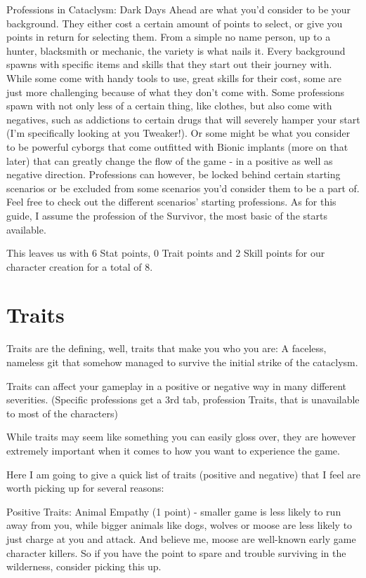 \documentclass[11pt]{report}
\begin{document}
Professions in Cataclysm: Dark Days Ahead are what you'd consider to be your background. They either cost a certain amount of points to select, or give you points in return for selecting them. From a simple no name person, up to a hunter, blacksmith or mechanic, the variety is what nails it. Every background spawns with specific items and skills that they start out their journey with. While some come with handy tools to use, great skills for their cost, some are just more challenging because of what they don't come with. Some professions spawn with not only less of a certain thing, like clothes, but also come with negatives, such as addictions to certain drugs that will severely hamper your start (I'm specifically looking at you Tweaker!). Or some might be what you consider to be powerful cyborgs that come outfitted with Bionic implants (more on that later) that can greatly change the flow of the game - in a positive as well as negative direction. Professions can however, be locked behind certain starting scenarios or be excluded from some scenarios you'd consider them to be a part of. Feel free to check out the different scenarios' starting professions. As for this guide, I assume the profession of the Survivor, the most basic of the starts available.

This leaves us with 6 Stat points, 0 Trait points and 2 Skill points for our character creation for a total of 8.

\section{Traits}

Traits are the defining, well, traits that make you who you are: A faceless, nameless git that somehow managed to survive the initial strike of the cataclysm.

Traits can affect your gameplay in a positive or negative way in many different severities. (Specific professions get a 3rd tab, profession Traits, that is unavailable to most of the characters)

While traits may seem like something you can easily gloss over, they are however extremely important when it comes to how you want to experience the game.

  Here I am going to give a quick list of traits (positive and negative) that I feel are worth picking up for several reasons:

Positive Traits:
Animal Empathy (1 point) - smaller game is less likely to run away from you, while bigger animals like dogs, wolves or moose are less likely to just charge at you and attack. And believe me, moose are well-known early game character killers. So if you have the point to spare and trouble surviving in the wilderness, consider picking this up.
\end{document}
